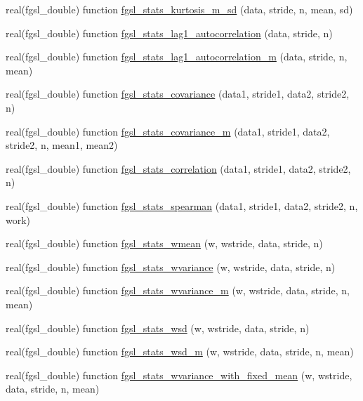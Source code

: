 \begin{DoxyCompactItemize}
\item 
real(fgsl\-\_\-double) function \hyperlink{statistics_8finc_a73f37fa7fc26bbc32b2ec4f430ff4237}{fgsl\-\_\-stats\-\_\-kurtosis\-\_\-m\-\_\-sd} (data, stride, n, mean, sd)
\item 
real(fgsl\-\_\-double) function \hyperlink{statistics_8finc_aec9e1868404363cdd4071d759452dffa}{fgsl\-\_\-stats\-\_\-lag1\-\_\-autocorrelation} (data, stride, n)
\item 
real(fgsl\-\_\-double) function \hyperlink{statistics_8finc_ab2de33bfbff99ba0e1519a92ffc2a198}{fgsl\-\_\-stats\-\_\-lag1\-\_\-autocorrelation\-\_\-m} (data, stride, n, mean)
\item 
real(fgsl\-\_\-double) function \hyperlink{statistics_8finc_abe8b984e22ce9662518b3058c5ed3fc9}{fgsl\-\_\-stats\-\_\-covariance} (data1, stride1, data2, stride2, n)
\item 
real(fgsl\-\_\-double) function \hyperlink{statistics_8finc_a022a3337d746efe8ba47bb7b790978a9}{fgsl\-\_\-stats\-\_\-covariance\-\_\-m} (data1, stride1, data2, stride2, n, mean1, mean2)
\item 
real(fgsl\-\_\-double) function \hyperlink{statistics_8finc_ad641fcad25f9ad39af269073822f3700}{fgsl\-\_\-stats\-\_\-correlation} (data1, stride1, data2, stride2, n)
\item 
real(fgsl\-\_\-double) function \hyperlink{statistics_8finc_ad2978bbd93b93ac7bb5e47373546bbd6}{fgsl\-\_\-stats\-\_\-spearman} (data1, stride1, data2, stride2, n, work)
\item 
real(fgsl\-\_\-double) function \hyperlink{statistics_8finc_ac44e8f61b5d6ece8de2c7859c7324df9}{fgsl\-\_\-stats\-\_\-wmean} (w, wstride, data, stride, n)
\item 
real(fgsl\-\_\-double) function \hyperlink{statistics_8finc_a7369e6ff86c963b93045d041e0318b37}{fgsl\-\_\-stats\-\_\-wvariance} (w, wstride, data, stride, n)
\item 
real(fgsl\-\_\-double) function \hyperlink{statistics_8finc_a58b0acc505557f72f2cfc2813e945666}{fgsl\-\_\-stats\-\_\-wvariance\-\_\-m} (w, wstride, data, stride, n, mean)
\item 
real(fgsl\-\_\-double) function \hyperlink{statistics_8finc_a07bed243844c213b933de5274daa9116}{fgsl\-\_\-stats\-\_\-wsd} (w, wstride, data, stride, n)
\item 
real(fgsl\-\_\-double) function \hyperlink{statistics_8finc_a9be620d1825095d70f5a3eb93f1e8304}{fgsl\-\_\-stats\-\_\-wsd\-\_\-m} (w, wstride, data, stride, n, mean)
\item 
real(fgsl\-\_\-double) function \hyperlink{statistics_8finc_a6106f2ae69fddefef4d5e233e54a8df0}{fgsl\-\_\-stats\-\_\-wvariance\-\_\-with\-\_\-fixed\-\_\-mean} (w, wstride, data, stride, n, mean)

\end{DoxyCompactItemize}
